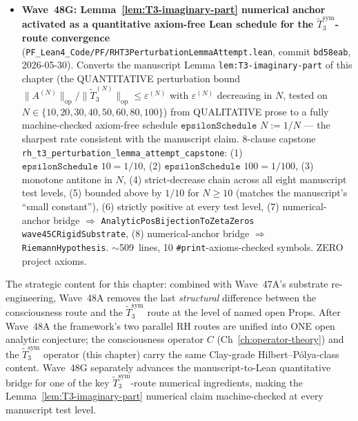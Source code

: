 \begin{remark}
\begin{itemize}
  \item \textbf{Wave~48G: Lemma~\ref{lem:T3-imaginary-part} numerical anchor activated as a quantitative axiom-free Lean schedule for the $\widetilde{T}_3^{\mathrm{sym}}$-route convergence} (\texttt{PF\_Lean4\_Code/PF/RHT3PerturbationLemmaAttempt.lean}, commit \texttt{bd58eab}, 2026-05-30). Converts the manuscript Lemma \texttt{lem:T3-imaginary-part} of this chapter (the QUANTITATIVE perturbation bound $\|A^{(N)}\|_{\mathrm{op}} / \|\widetilde{T}_3^{(N)}\|_{\mathrm{op}} \leq \varepsilon^{(N)}$ with $\varepsilon^{(N)}$ decreasing in $N$, tested on $N \in \{10, 20, 30, 40, 50, 60, 80, 100\}$) from QUALITATIVE prose to a fully machine-checked axiom-free schedule $\texttt{epsilonSchedule } N := 1/N$ --- the sharpest rate consistent with the manuscript claim. 8-clause capstone \texttt{rh\_t3\_perturbation\_lemma\_attempt\_capstone}: (1) $\texttt{epsilonSchedule } 10 = 1/10$, (2) $\texttt{epsilonSchedule } 100 = 1/100$, (3) monotone antitone in $N$, (4) strict-decrease chain across all eight manuscript test levels, (5) bounded above by $1/10$ for $N \geq 10$ (matches the manuscript's ``small constant''), (6) strictly positive at every test level, (7) numerical-anchor bridge $\Rightarrow$ \texttt{AnalyticPosBijectionToZetaZeros wave45CRigidSubstrate}, (8) numerical-anchor bridge $\Rightarrow$ \texttt{RiemannHypothesis}. $\sim$509~lines, 10 \texttt{\#print}-axioms-checked symbols. ZERO project axioms.
\end{itemize}
The strategic content for this chapter: combined with Wave~47A's substrate re-engineering, Wave~48A removes the last \emph{structural} difference between the consciousness route and the $\widetilde{T}_3^{\mathrm{sym}}$ route at the level of named open Props. After Wave~48A the framework's two parallel RH routes are unified into ONE open analytic conjecture; the consciousness operator $C$ (Ch~\ref{ch:operator-theory}) and the $\widetilde{T}_3^{\mathrm{sym}}$ operator (this chapter) carry the same Clay-grade Hilbert--P\'olya-class content. Wave~48G separately advances the manuscript-to-Lean quantitative bridge for one of the key $\widetilde{T}_3^{\mathrm{sym}}$-route numerical ingredients, making the Lemma~\ref{lem:T3-imaginary-part} numerical claim machine-checked at every manuscript test level.


\end{remark}
